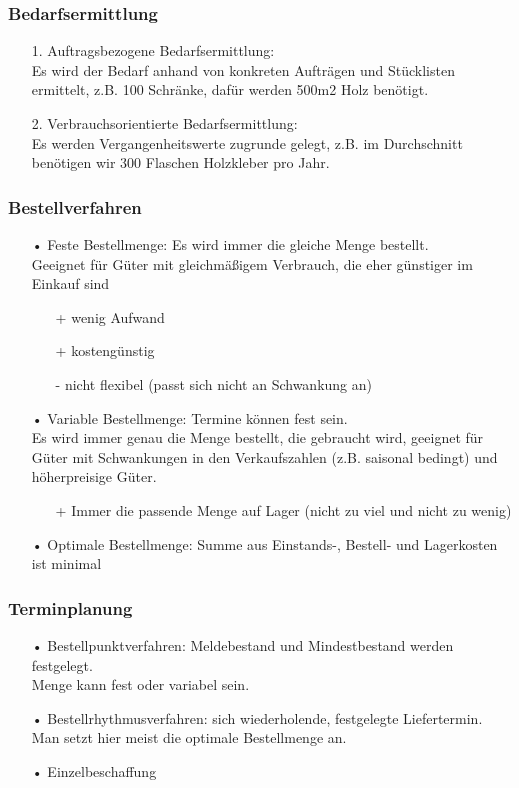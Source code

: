 \documentclass[10pt]{article}
\begin{document}
\subsubsection{Bedarfsermittlung}
\begin{itemize}
\item[1.] Auftragsbezogene Bedarfsermittlung: \\
Es wird der Bedarf anhand von konkreten Aufträgen und Stücklisten ermittelt, z.B. 100 Schränke, dafür werden 500m2 Holz benötigt.
\item[2.] Verbrauchsorientierte Bedarfsermittlung: \\
Es werden Vergangenheitswerte zugrunde gelegt, z.B. im Durchschnitt benötigen wir 300 Flaschen Holzkleber pro Jahr.
\end{itemize}

\subsubsection{Bestellverfahren}
\begin{itemize}
\item[•]Feste Bestellmenge: Es wird immer die gleiche Menge bestellt.  \\ Geeignet für Güter mit gleichmäßigem Verbrauch, die eher günstiger im Einkauf sind
\begin{itemize}
\item[+] wenig Aufwand
\item[+] kostengünstig
\item[-] nicht flexibel (passt sich nicht an Schwankung an)
\end{itemize}
\item[•]Variable Bestellmenge: Termine können fest sein. \\
Es wird immer genau die Menge bestellt, die gebraucht wird, geeignet für Güter mit Schwankungen in den Verkaufszahlen (z.B. saisonal bedingt) und höherpreisige Güter.
\begin{itemize}
\item[+]Immer die passende Menge auf Lager (nicht zu viel und nicht zu wenig)
\end{itemize}
\item[•]Optimale Bestellmenge: Summe aus Einstands-, Bestell- und Lagerkosten ist minimal
\end{itemize}

\subsubsection{Terminplanung}
\begin{itemize}
\item[•]Bestellpunktverfahren: Meldebestand und Mindestbestand werden festgelegt.\\
Menge kann fest oder variabel sein.
\item[•]Bestellrhythmusverfahren: sich wiederholende, festgelegte Liefertermin.\\
Man setzt hier meist die optimale Bestellmenge an.
\item[•]Einzelbeschaffung
\end{itemize}
\end{document}
